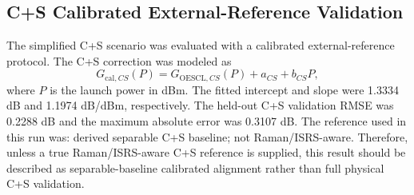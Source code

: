 \subsection{C+S Calibrated External-Reference Validation}
The simplified C+S scenario was evaluated with a calibrated external-reference protocol. The C+S correction was modeled as
\begin{equation}
G_{\mathrm{cal},CS}(P)=G_{\mathrm{OESCL},CS}(P)+a_{CS}+b_{CS}P,
\end{equation}
where $P$ is the launch power in dBm. The fitted intercept and slope were 1.3334 dB and 1.1974 dB/dBm, respectively. The held-out C+S validation RMSE was 0.2288 dB and the maximum absolute error was 0.3107 dB. The reference used in this run was: derived separable C+S baseline; not Raman/ISRS-aware. Therefore, unless a true Raman/ISRS-aware C+S reference is supplied, this result should be described as separable-baseline calibrated alignment rather than full physical C+S validation.
